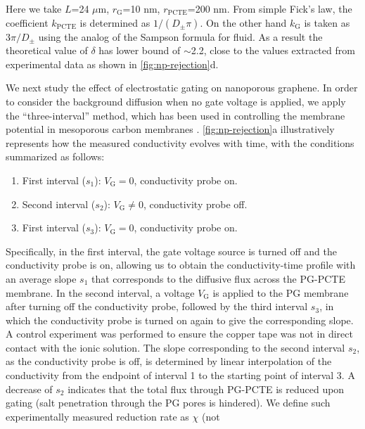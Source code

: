 Here we take $L$=24 $\mu$m, $r_{\mathrm{G}}$=10 nm,
$r_{\mathrm{PCTE}}$=200 nm. From simple Fick's law, the coefficient
$k_{\mathrm{PCTE}}$ is determined as $1/(D_{\mathrm{\pm}} \pi)$. On
the other hand $k_{\mathrm{G}}$ is taken as $3 \pi / D_{\mathrm{\pm}}$
using the analog of the Sampson formula for
fluid\autocite{Roscoe_1949_sampson_formula}. As a result the theoretical
value of $\delta$ has lower bound of $\sim$2.2, close to the values
extracted from experimental data as shown in \autoref{fig:np-rejection}d.

  
We next study the effect of electrostatic gating on nanoporous graphene. 
In order to consider the background diffusion when no gate voltage is
applied, we apply the ``three-interval'' method, which has been used in
controlling the membrane potential in mesoporous carbon membranes
\autocite{Surwade_2014_carbon_electrochemical_ion}.
%
\autoref{fig:np-rejection}a illustratively represents how the measured
conductivity evolves with time, with the conditions summarized as
follows:
\begin{enumerate}
\item First interval ($s_{1}$): $V_{\mathrm{G}} = 0$, conductivity probe on.
  
\item Second interval ($s_{2}$): $V_{\mathrm{G}} \neq 0$, conductivity probe off.

  \item First interval ($s_{3}$): $V_{\mathrm{G}} = 0$, conductivity probe on.
\end{enumerate}
Specifically, in the first interval,
the gate voltage source is turned off and the conductivity probe is
on, allowing us to obtain the conductivity-time profile with an
average slope $s_{1}$ that corresponds to the diffusive flux across
the PG-PCTE membrane. In the second interval, a voltage
$V_{\mathrm{G}}$ is applied to the PG membrane after turning off the
conductivity probe, followed by the third interval $s_{3}$, in which
the conductivity probe is turned on again to give the corresponding
slope. A control experiment was performed to ensure the copper tape
was not in direct contact with the ionic solution.
%
The slope corresponding to the
second interval $s_{2}$, as the conductivity probe is off, is
determined by linear interpolation of the conductivity from the
endpoint of interval 1 to the starting point of interval 3. A decrease
of $s_{2}$ indicates that the total flux through
PG-PCTE is reduced upon gating (\ie salt penetration through the PG
pores is hindered).
%
We define such experimentally measured reduction rate as $\chi$ (not
